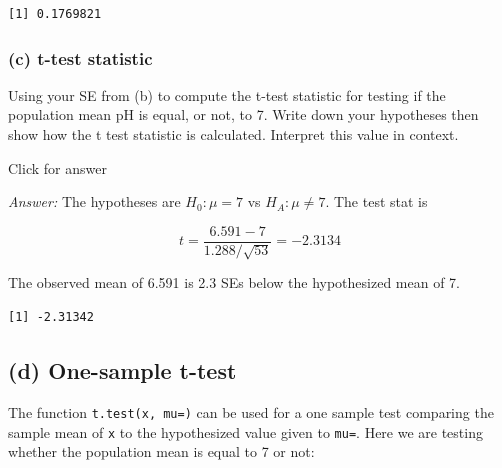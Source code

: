 \documentclass[
]{book}
\newenvironment{Shaded}{\begin{snugshade}}{\end{snugshade}}
\newcommand{\AttributeTok}[1]{\textcolor[rgb]{0.77,0.63,0.00}{#1}}
\newcommand{\DecValTok}[1]{\textcolor[rgb]{0.00,0.00,0.81}{#1}}
\newcommand{\FunctionTok}[1]{\textcolor[rgb]{0.00,0.00,0.00}{#1}}
\newcommand{\NormalTok}[1]{#1}
\newcommand{\SpecialCharTok}[1]{\textcolor[rgb]{0.00,0.00,0.00}{#1}}
\begin{document}
\begin{verbatim}
[1] 0.1769821
\end{verbatim}

\hypertarget{c-t-test-statistic-2}{%
\subsubsection{(c) t-test statistic}\label{c-t-test-statistic-2}}

Using your SE from (b) to compute the t-test statistic for testing if the population mean pH is equal, or not, to 7. Write down your hypotheses then show how the t test statistic is calculated. Interpret this value in context.

Click for answer

\emph{Answer:} The hypotheses are \(H_0: \mu = 7\) vs \(H_A: \mu \neq 7\). The test stat is

\[
t = \dfrac{6.591 - 7}{1.288/\sqrt{53}} = -2.3134
\]

The observed mean of 6.591 is 2.3 SEs below the hypothesized mean of 7.

\begin{Shaded}
\end{Shaded}

\begin{verbatim}
[1] -2.31342
\end{verbatim}

\hypertarget{d-one-sample-t-test-1}{%
\subsection{(d) One-sample t-test}\label{d-one-sample-t-test-1}}

The function \texttt{t.test(x,\ mu=)} can be used for a one sample test comparing the sample mean of \texttt{x} to the hypothesized value given to \texttt{mu=}. Here we are testing whether the population mean is equal to 7 or not:

\begin{Shaded}
\end{Shaded}
\end{document}
